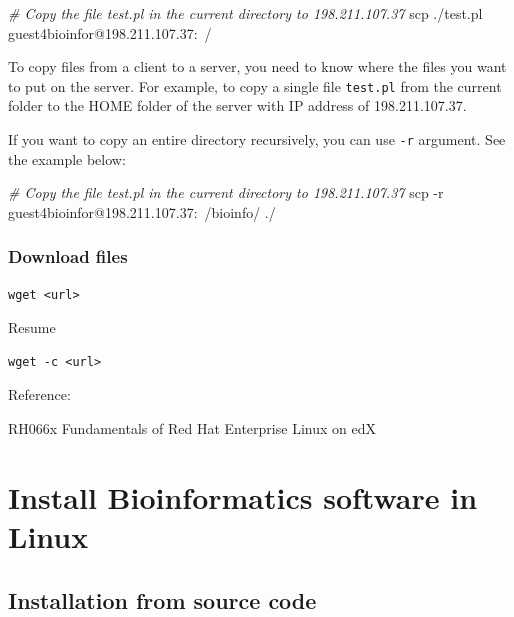 \documentclass[]{book}
\makeatletter
\newenvironment{Shaded}{\begin{snugshade}}{\end{snugshade}}
\newcommand{\CommentTok}[1]{\textcolor[rgb]{0.56,0.35,0.01}{\textit{#1}}}
\newcommand{\FunctionTok}[1]{\textcolor[rgb]{0.00,0.00,0.00}{#1}}
\newcommand{\NormalTok}[1]{#1}
\newenvironment{kframe}{%
\medskip{}
\setlength{\fboxsep}{.8em}
 \def\at@end@of@kframe{}%
 \ifinner\ifhmode%
  \def\at@end@of@kframe{\end{minipage}}%
  \begin{minipage}{\columnwidth}%
 \fi\fi%
 \def\FrameCommand##1{\hskip\@totalleftmargin \hskip-\fboxsep
 \colorbox{shadecolor}{##1}\hskip-\fboxsep
     \hskip-\linewidth \hskip-\@totalleftmargin \hskip\columnwidth}%
 \MakeFramed {\advance\hsize-\width
   \@totalleftmargin\z@ \linewidth\hsize
   \@setminipage}}%
 {\par\unskip\endMakeFramed%
 \at@end@of@kframe}
\renewenvironment{Shaded}{\begin{kframe}}{\end{kframe}}
\makeatother
\begin{document}
\begin{Shaded}
\begin{Highlighting}[]
\CommentTok{# Copy the file test.pl in the current directory to  198.211.107.37}
\FunctionTok{scp}\NormalTok{ ./test.pl guest4bioinfor@198.211.107.37:~/}
\end{Highlighting}
\end{Shaded}

To copy files from a client to a server, you need to know where the files you want to put on the server. For example, to copy a single file \texttt{test.pl} from the current folder to the HOME folder of the server with IP address of 198.211.107.37.

If you want to copy an entire directory recursively, you can use \texttt{-r} argument. See the example below:

\begin{Shaded}
\begin{Highlighting}[]
\CommentTok{# Copy the file test.pl in the current directory to  198.211.107.37}
\FunctionTok{scp}\NormalTok{ -r guest4bioinfor@198.211.107.37:~/bioinfo/ ./}
\end{Highlighting}
\end{Shaded}

\hypertarget{download-files}{%
\subsection{Download files}\label{download-files}}

\begin{verbatim}
wget <url>
\end{verbatim}

Resume

\begin{verbatim}
wget -c <url>  
\end{verbatim}

Reference:

RH066x Fundamentals of Red Hat Enterprise Linux on edX

\hypertarget{install-bioinformatics-software-in-linux}{%
\chapter{Install Bioinformatics software in Linux}\label{install-bioinformatics-software-in-linux}}

\hypertarget{installation-from-source-code}{%
\section{Installation from source code}\label{installation-from-source-code}}
\end{document}

